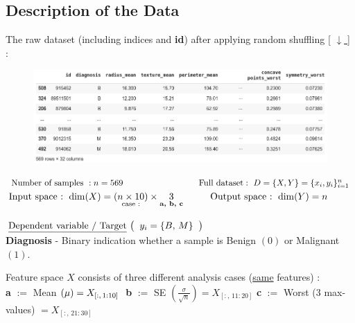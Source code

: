 \documentclass[12pt]{article}
\newcommand\tab[1][1cm]{\hspace*{#1}}
\numberwithin{equation}{section}
\begin{document}
\begin{flushleft}
\section{Description of the Data}
The raw dataset (including indices and \textbf{id}) after applying random shuffling [ \href{https://archive.ics.uci.edu/ml/machine-learning-databases/breast-cancer-wisconsin/wdbc.data}{\underline{ $\downarrow$ }} ] : \\[0.2cm]
\begin{figure}[H]
\centering
\includegraphics[scale=0.55]{data_table.png}
\end{figure}
${\text{Number of samples }} : n = 569  \hspace{3.1cm} {\text{Full dataset}} : \ D = \{ X, Y \} = \{ x_i, y_i \}_{i=1}^{n}$ \\[0.1cm]

$ \text{Input space : }  \dim(X) = ( \underset{\text{case :}}{n \times 10}) \times \underset{\text{\textbf{a, b, c}}}{3} \tab \text{Output space : }\dim(Y) = n $  \\ \vspace{3mm}

$\underline{\text{Dependent variable / Target}} \ \big( \hspace{2mm} y_i = \{B, \, M  \} \hspace{2mm} \big)$ \\ \vspace{2mm}
\tab  \textbf{Diagnosis} - Binary indication whether a sample is Benign $(0)$ or Malignant $(1)$.

Feature space $X$ consists of three different analysis cases (\underline{same} features) : \\[2mm]
\textbf{a} $:=$ Mean $(\mu) =  X_{[:, \, 1:10]} \hspace{0.1cm}$ \hspace{2mm}
\textbf{b} $:=$ SE $(\frac{\sigma}{\sqrt{n}})  = X_{[:, \, 11:20]}$ \hspace{1.5mm}
\textbf{c} $:=$ Worst (3 max-values) $ = X_{[:, \, 21:30]}$ \\[0.4cm]


\end{flushleft}
\end{document}
